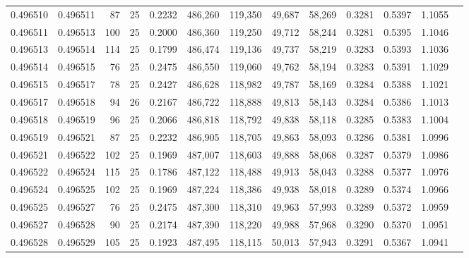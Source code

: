 \begin{tabular}{rrrrrrrrrrrrr}
0.496510 & 0.496511 &    87 &  25 &                                     0.2232 & 486,260 & 119,350 &  49,687 &  58,269 & 0.3281 & 0.5397 & 1.1055 \\
0.496511 & 0.496513 &   100 &  25 &                                     0.2000 & 486,360 & 119,250 &  49,712 &  58,244 & 0.3281 & 0.5395 & 1.1046 \\
0.496513 & 0.496514 &   114 &  25 &                                     0.1799 & 486,474 & 119,136 &  49,737 &  58,219 & 0.3283 & 0.5393 & 1.1036 \\
0.496514 & 0.496515 &    76 &  25 &                                     0.2475 & 486,550 & 119,060 &  49,762 &  58,194 & 0.3283 & 0.5391 & 1.1029 \\
0.496515 & 0.496517 &    78 &  25 &                                     0.2427 & 486,628 & 118,982 &  49,787 &  58,169 & 0.3284 & 0.5388 & 1.1021 \\
0.496517 & 0.496518 &    94 &  26 &                                     0.2167 & 486,722 & 118,888 &  49,813 &  58,143 & 0.3284 & 0.5386 & 1.1013 \\
0.496518 & 0.496519 &    96 &  25 &                                     0.2066 & 486,818 & 118,792 &  49,838 &  58,118 & 0.3285 & 0.5383 & 1.1004 \\
0.496519 & 0.496521 &    87 &  25 &                                     0.2232 & 486,905 & 118,705 &  49,863 &  58,093 & 0.3286 & 0.5381 & 1.0996 \\
0.496521 & 0.496522 &   102 &  25 &                                     0.1969 & 487,007 & 118,603 &  49,888 &  58,068 & 0.3287 & 0.5379 & 1.0986 \\
0.496522 & 0.496524 &   115 &  25 &                                     0.1786 & 487,122 & 118,488 &  49,913 &  58,043 & 0.3288 & 0.5377 & 1.0976 \\
0.496524 & 0.496525 &   102 &  25 &                                     0.1969 & 487,224 & 118,386 &  49,938 &  58,018 & 0.3289 & 0.5374 & 1.0966 \\
0.496525 & 0.496527 &    76 &  25 &                                     0.2475 & 487,300 & 118,310 &  49,963 &  57,993 & 0.3289 & 0.5372 & 1.0959 \\
0.496527 & 0.496528 &    90 &  25 &                                     0.2174 & 487,390 & 118,220 &  49,988 &  57,968 & 0.3290 & 0.5370 & 1.0951 \\
0.496528 & 0.496529 &   105 &  25 &                                     0.1923 & 487,495 & 118,115 &  50,013 &  57,943 & 0.3291 & 0.5367 & 1.0941 \\

\end{tabular}
